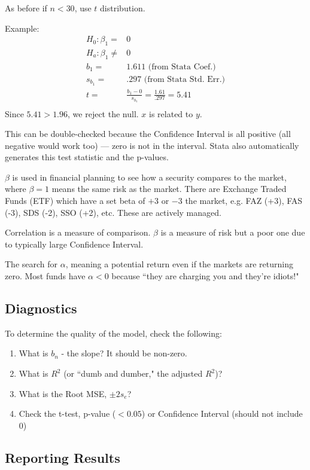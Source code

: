 \documentclass[11pt, oneside]{article}   	%
\begin{document}
As before if $n < 30$, use $t$ distribution. 

Example:
\begin{align*}
H_0 : \beta_1 =& 0\\
H_a : \beta_1 \neq& 0\\
b_1 =& 1.611 \text{ (from Stata Coef.)}\\
s_{b_1} =& .297 \text{ (from Stata Std. Err.)} \\
t =& \frac{b_1 - 0}{s_{b_1}} = \frac{1.61}{.297} = 5.41\\
\end{align*}
Since $5.41 > 1.96$, we reject the null. $x$ is related to $y$. 

This can be double-checked because the Confidence Interval is all positive (all negative would work too) --- zero is not in the interval. Stata also automatically generates this test statistic and the p-values.

$\beta$ is used in financial planning to see how a security compares to the market, where $\beta = 1$ means the same risk as the market. There are Exchange Traded Funds (ETF) which have a set beta of $+3$ or $-3$ the market, e.g. FAZ (+3), FAS (-3), SDS (-2), SSO (+2), etc. These are actively managed.

Correlation is a measure of comparison. $\beta$ is a measure of risk but a poor one due to typically large Confidence Interval.

The search for $\alpha$, meaning a potential return even if the markets are returning zero. Most funds have $\alpha < 0$ because ``they are charging you and they're idiots!"

\subsection{Diagnostics}

To determine the quality of the model, check the following:
\begin{enumerate}
\item{What is $b_n$ - the slope? It should be non-zero.}
\item{What is $R^2$ (or ``dumb and dumber," the adjusted $R^2$)?}
\item{What is the Root MSE, $\pm 2 s_e$?}
\item{Check the t-test, p-value ($< 0.05$) or Confidence Interval (should not include 0)}
\end{enumerate}

\subsection{Reporting Results}
\end{document}
